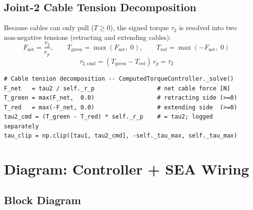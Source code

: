 \documentclass[11pt, a4paper]{article}
\newcommand{\rp}{r_p}
\begin{document}
\subsection{Joint-2 Cable Tension Decomposition}

Because cables can only pull ($T \ge 0$), the signed torque $\tau_2$ is
resolved into two non-negative tensions (retracting and extending cables):
\begin{equation}
  F_\text{net} = \frac{\tau_2}{\rp}, \qquad
  T_\text{green} = \max(F_\text{net},\;0), \qquad
  T_\text{red}   = \max(-F_\text{net},\;0)
  \label{eq:tension-decomp}
\end{equation}
\begin{equation}
  \tau_{2,\text{cmd}} = (T_\text{green} - T_\text{red})\,\rp = \tau_2
\end{equation}

\begin{lstlisting}
# Cable tension decomposition -- ComputedTorqueController._solve()
F_net   = tau2 / self._r_p                  # net cable force [N]
T_green = max(F_net,  0.0)                  # retracting side (>=0)
T_red   = max(-F_net, 0.0)                  # extending side  (>=0)
tau2_cmd = (T_green - T_red) * self._r_p    # = tau2; logged separately
tau_clip = np.clip([tau1, tau2_cmd], -self._tau_max, self._tau_max)
\end{lstlisting}

\section{Diagram: Controller + SEA Wiring}

\subsection{Block Diagram}
\end{document}
